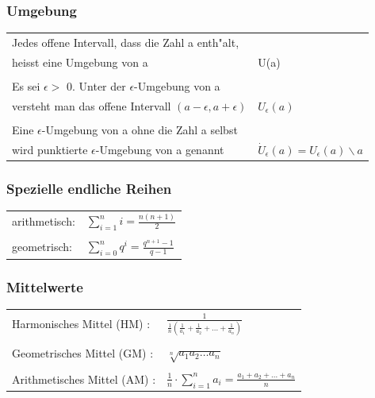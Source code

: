 				 
			\subsubsection{Umgebung}
				\begin{tabular}{ll} 
				Jedes offene Intervall, dass die Zahl a enth"alt, \\ heisst eine Umgebung von a &  U(a)\\
				\\
				 Es sei $\epsilon >$ 0. Unter der $\epsilon$-Umgebung von a \\ versteht man das offene Intervall $(a-\epsilon,a+\epsilon)$ &  $U_\epsilon(a)$\\ 
				 \\
				 Eine $\epsilon$-Umgebung von a ohne die Zahl a selbst \\ wird punktierte $\epsilon$-Umgebung von a genannt & $\dot{U}_\epsilon(a)=U_\epsilon(a)\smallsetminus{a}$ 
				\end{tabular}
			

			
			
			\subsubsection{Spezielle endliche Reihen}
			\begin{tabular}{ll} 
				arithmetisch: & $\sum\limits _{i=1}^n i = \frac{n(n+1)}{2}$ \\
				\\
				geometrisch: & $\sum\limits _{i=0}^n q^i = \frac{q^{n+1} - 1}{q - 1}$ 
			\end{tabular}
			
			
			\subsubsection{Mittelwerte}
			\begin{tabular}{ll} 
				Harmonisches Mittel (HM) : &  $\frac{1}{\frac{1}{n}(\frac{1}{a_1}+\frac{1}{a_2}+...+\frac{1}{a_n})}$ \\
				\\
				Geometrisches Mittel (GM) : & $\sqrt[n]{a_1 a_2 \ldots a_n}$ \\
				\\
				Arithmetisches Mittel (AM) : & $\frac{1}{n} \cdot \sum\limits _{i=1}^n a_i = 	\frac{a_1+a_2+...+a_n}{n}$ 
			\end{tabular}
			
			
